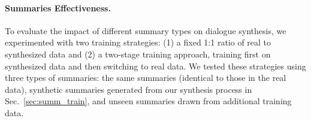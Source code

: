 


\paragraph{Summaries Effectiveness.}
To evaluate the impact of different summary types on dialogue synthesis, we experimented with two training strategies: (1) a fixed 1:1 ratio of real to synthesized data and (2) a two-stage training approach, training first on synthesized data and then switching to real data. We tested these strategies using three types of summaries: the same summaries (identical to those in the real data), synthetic summaries generated from our synthesis process in Sec.~\ref{sec:summ_train}, and unseen summaries drawn from additional training data.

